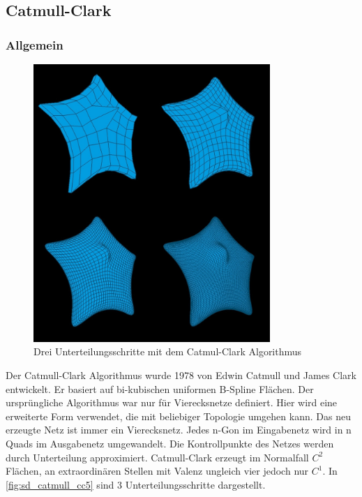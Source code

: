 \subsection{Catmull-Clark} \label{subsec:catmull}

\subsubsection*{Allgemein}

\begin{figure}
\centering
\includegraphics[width=0.8\textwidth]{content/media/cc5_edge_catmull.jpg}
\caption{Drei Unterteilungsschritte mit dem Catmul-Clark Algorithmus}
\label{fig:sd_catmull_cc5}
\end{figure}

Der Catmull-Clark Algorithmus wurde 1978 von Edwin Catmull und James Clark entwickelt.
Er basiert auf bi-kubischen uniformen B-Spline Flächen.
Der ursprüngliche Algorithmus war nur für Vierecksnetze definiert.
Hier wird eine erweiterte Form verwendet, die mit beliebiger Topologie umgehen kann.
Das neu erzeugte Netz ist immer ein Vierecksnetz.
Jedes n-Gon im Eingabenetz wird in n Quads
im Ausgabenetz umgewandelt.
Die Kontrollpunkte des Netzes werden durch Unterteilung approximiert.
Catmull-Clark erzeugt im Normalfall \(C^2\) Flächen,
an extraordinären Stellen mit Valenz ungleich vier jedoch
nur \(C^1\).
In \autoref{fig:sd_catmull_cc5} sind 3 Unterteilungsschritte dargestellt.
\cite[S. 75 ff.]{Zorin.subdivcourse} \cite[S. 52 ff.]{Standford.24.07.2015}


